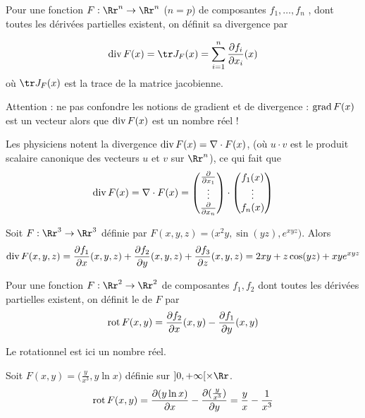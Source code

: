 \documentclass[12pt, class=report,crop=false]{standalone}
\begin{document}
\bigskip
  

Pour une fonction  $F : \Rr^n \to \Rr^n$ ($n=p$)
de composantes $f_1,\ldots,f_n$ , dont toutes les dérivées partielles existent, on définit sa divergence par

$$\diver F (x) = \tr J_F (x)
= \sum_{i=1}^n \frac{\partial f_i}{\partial x_i}(x)$$
où $\tr J_F(x)$ est la trace de la matrice jacobienne. 

Attention : ne pas confondre les notions de gradient et de divergence : $\operatorname{grad} F(x)$ est un vecteur alors que $\operatorname{div} F(x)$ est un nombre réel !

Les physiciens notent la divergence $\operatorname{div} F(x)=\nabla \cdot F(x)$, 
(où $u \cdot v$ est le produit scalaire canonique des vecteurs $u$ et $v$ sur $\Rr^n$), ce qui fait que
$$\operatorname{div} F (x) = \nabla \cdot F(x)
= \begin{pmatrix}
\frac{\partial}{\partial x_1}\\
\vdots\\
\frac{\partial }{\partial x_n}
\end{pmatrix}
\cdot 
\begin{pmatrix}
f_1(x) \\
\vdots \\
f_n(x)
\end{pmatrix}
$$


\begin{exemple}
Soit $F : \Rr^3 \to \Rr^3$ définie par 
$F(x,y,z) = \big( x^2y, \sin(yz), e^{xyz} \big)$.
Alors $$\operatorname{div} F (x,y,z) = 
\frac{\partial f_1}{\partial x}(x,y,z)+
\frac{\partial f_2}{\partial y}(x,y,z)+
\frac{\partial f_3}{\partial z}(x,y,z)
= 2xy + z\cos(yz) + xye^{xyz}
$$
\end{exemple}


\bigskip
\bigskip


Pour une fonction  $F : \Rr^2 \to \Rr^2$ de composantes $f_1,f_2$ dont toutes les dérivées partielles existent, on définit le  de $F$ par
$$\operatorname{rot} F (x,y) = \frac{\partial f_2}{\partial x}(x,y)-\frac{\partial f_1}{\partial y}(x,y)
$$

Le rotationnel est ici un nombre réel.

\begin{exemple}
Soit $F(x,y) = \big( \frac{y}{x^3},  y\ln x \big)$ définie sur $]0,+\infty[ \times \Rr$.
$$\operatorname{rot} F (x,y) = 
\frac{\partial (y\ln x)}{\partial x} -    \frac{\partial (\frac{y}{x^3})}{\partial y}
    = \frac{y}{x} - \frac{1}{x^3}
$$
\end{exemple}
\end{document}

